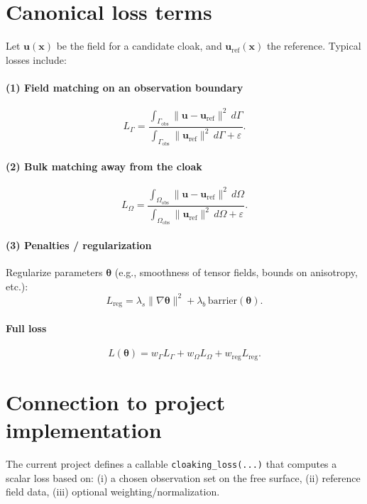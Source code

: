 \documentclass[11pt,a4paper]{report}
\begin{document}
\section{Canonical loss terms}
Let $\bm u(\bm x)$ be the field for a candidate cloak, and $\bm u_{\mathrm{ref}}(\bm x)$ the reference.
Typical losses include:

\paragraph{(1) Field matching on an observation boundary}
\begin{equation}
L_{\Gamma} = \frac{\int_{\Gamma_{\mathrm{obs}}} \|\bm u - \bm u_{\mathrm{ref}}\|^2\, d\Gamma}{\int_{\Gamma_{\mathrm{obs}}} \|\bm u_{\mathrm{ref}}\|^2\, d\Gamma + \varepsilon}.
\end{equation}

\paragraph{(2) Bulk matching away from the cloak}
\begin{equation}
L_{\Omega} = \frac{\int_{\Omega_{\mathrm{obs}}} \|\bm u - \bm u_{\mathrm{ref}}\|^2\, d\Omega}{\int_{\Omega_{\mathrm{obs}}} \|\bm u_{\mathrm{ref}}\|^2\, d\Omega + \varepsilon}.
\end{equation}

\paragraph{(3) Penalties / regularization}
Regularize parameters $\bm\theta$ (e.g., smoothness of tensor fields, bounds on anisotropy, etc.):
\begin{equation}
L_{\mathrm{reg}} = \lambda_s \|\nabla \bm\theta\|^2 + \lambda_b\,\mathrm{barrier}(\bm\theta).
\end{equation}

\paragraph{Full loss}
\begin{equation}
L(\bm\theta) = w_\Gamma L_{\Gamma} + w_\Omega L_{\Omega} + w_{\mathrm{reg}} L_{\mathrm{reg}}.
\end{equation}

\section{Connection to project implementation}
The current project defines a callable \texttt{cloaking\_loss(...)} that computes a scalar loss based on:
(i) a chosen observation set on the free surface,
(ii) reference field data,
(iii) optional weighting/normalization.
\end{document}
